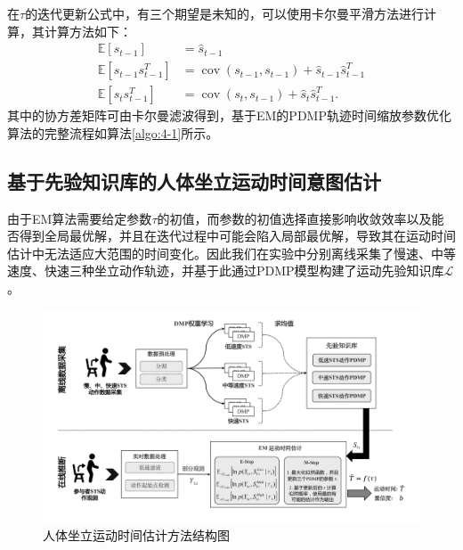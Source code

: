 在$\tau$的迭代更新公式中，有三个期望是未知的，可以使用卡尔曼平滑方法进行计算\cite{bishopPatternRecognitionMachine2006}，其计算方法如下：
\begin{equation}
    \begin{aligned}
    \mathbb{E}\left[s_{t-1}\right] & =\hat{s}_{t-1} \\
    \mathbb{E}\left[s_{t-1} s_{t-1}^T\right] & =\operatorname{cov}\left(s_{t-1}, s_{t-1}\right)+\hat{s}_{t-1} \hat{s}_{t-1}^T \\
    \mathbb{E}\left[s_t s_{t-1}^T\right] & =\operatorname{cov}\left(s_t, s_{t-1}\right)+\hat{s}_t \hat{s}_{t-1}^T .
    \end{aligned}
    \label{eq:4-36}
\end{equation}
其中的协方差矩阵可由卡尔曼滤波得到，基于EM的PDMP轨迹时间缩放参数优化算法的完整流程如算法\ref{algo:4-1}所示。

\subsection{基于先验知识库的人体坐立运动时间意图估计}
由于EM算法需要给定参数$\tau$的初值，而参数的初值选择直接影响收敛效率以及能否得到全局最优解，并且在迭代过程中可能会陷入局部最优解，导致其在运动时间估计中无法适应大范围的时间变化。因此我们在实验中分别离线采集了慢速、中等速度、快速三种坐立动作轨迹，并基于此通过PDMP模型构建了运动先验知识库$\mathscr{L}$。

\begin{figure}[htb]
    \centering\includegraphics[width=1\textwidth]{figures/4-Fig-3.pdf}
    \caption{人体坐立运动时间估计方法结构图}
    \label{fig:4-3}
\end{figure}

